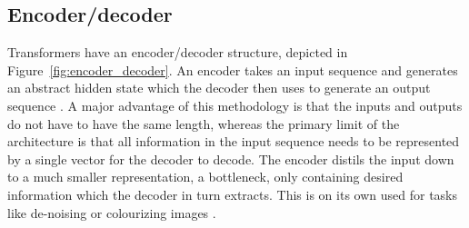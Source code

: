 


\subsection{Encoder/decoder}
Transformers have an encoder/decoder structure, depicted in Figure~\ref{fig:encoder_decoder}. An encoder takes an input sequence and generates an abstract hidden state which the decoder then uses to generate an output sequence \cite{vaswani_attention_2017}. A major advantage of this methodology is that the inputs and outputs do not have to have the same length, whereas the primary limit of the architecture is that all information in the input sequence needs to be represented by a single vector for the decoder to decode. The encoder distils the input down to a much smaller representation, a bottleneck, only containing desired information which the decoder in turn extracts. This is on its own used for tasks like de-noising or colourizing images \cite{nechu_what_2020}. 

